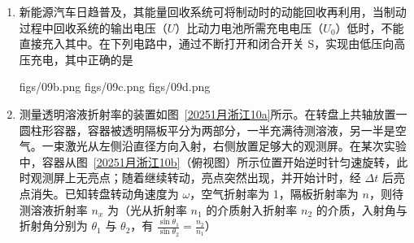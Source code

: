 \documentclass[\gkver]{gaokaozhenti}
\begin{document}
\begin{enumerate}
{即最终三者一起静止，可知经历的时间 $t = \frac{v_{C}}{\mu g} = \frac{2}{0.5 \times 10} \Us = 0.4 \Us$，选项 B 错误；

C．碰撞到三者相对静止摩擦产生的热量 $Q = \frac{1}{2} \times 2mv_{1}^{2} + \frac{1}{2} \times 2mv_{C}^{2} = 3 \UJ$。选项 C 错误；

D．碰撞到三者相对静止由能量关系可知 $Q = \mu mgx_{\text{相对}}$ 可得 $x_{\text{相对}} = 0.6 \Um$。选项 D 正确。

故选 D。
}

\item
新能源汽车日趋普及，其能量回收系统可将制动时的动能回收再利用，当制动过程中回收系统的输出电压（$U$）比动力电池所需充电电压（$U_{0}$）低时，不能直接充入其中。在下列电路中，通过不断打开和闭合开关 S，实现由低压向高压充电，其中正确的是

{figs/09b.png}
{figs/09c.png}
{figs/09d.png}


\item
测量透明溶液折射率的装置如图~\ref{20251月浙江10a}所示。在转盘上共轴放置一圆柱形容器，容器被透明隔板平分为两部分，一半充满待测溶液，另一半是空气。一束激光从左侧沿直径方向入射，右侧放置足够大的观测屏。在某次实验中，容器从图~\ref{20251月浙江10b}（俯视图）所示位置开始逆时针匀速旋转，此时观测屏上无亮点；随着继续转动，亮点突然出现，并开始计时，经 $\Delta t$ 后亮点消失。已知转盘转动角速度为 $\omega$，空气折射率为 1，隔板折射率为 $n$，则待测溶液折射率 $n_{x}$ 为（光从折射率 $n_{1}$ 的介质射入折射率 $n_{2}$ 的介质，入射角与折射角分别为 $\theta_{1}$ 与 $\theta_{2}$，有 $\frac{\sin\theta_{1}}{\sin\theta_{2}} = \frac{n_{2}}{n_{1}}$）


\end{enumerate}
\end{document}
